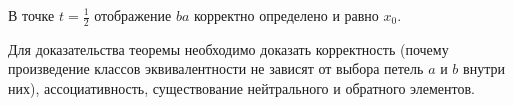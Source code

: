 \documentclass[main]{subfiles}
\begin{document}
\begin{remark}
	В точке $ t = \frac{1}{2} $ отображение $ ba $ корректно определено и равно $ x_0 $.
\end{remark}

\begin{remark}
	Для доказательства теоремы необходимо доказать корректность (почему произведение классов эквивалентности
	не зависят от выбора петель $ a $ и $ b $ внутри них), ассоциативность, существование нейтрального и
	обратного элементов.
\end{remark}
\end{document}
